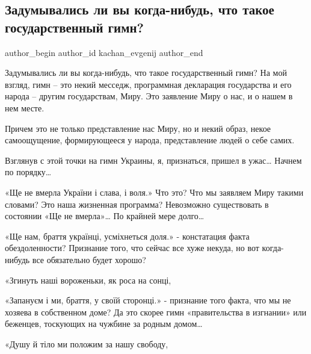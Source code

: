  
 
 
 
 
 
\subsection{Задумывались ли вы когда-нибудь, что такое государственный гимн?}
\label{sec:06_07_2021.fb.kachan_evgenij.1.gos_gimn_ukraina}
 
\ifcmt
 author_begin
   author_id kachan_evgenij
 author_end
\fi

Задумывались ли вы когда-нибудь, что такое государственный гимн? На мой взгляд,
гимн – это некий месседж, программная декларация государства и его народа –
другим государствам, Миру. Это заявление Миру о нас, и о нашем в нем месте.

Причем это не только представление нас Миру, но и некий образ, некое
самоощущение, формирующееся у народа, представление людей о себе самих.

Взглянув с этой точки на гимн Украины, я, признаться, пришел в ужас… Начнем по порядку…

«Ще не вмерла України і слава, і воля.» Что это? Что мы заявляем Миру такими
словами? Это наша жизненная программа? Невозможно существовать в состоянии «Ще
не вмерла»… По крайней мере долго… 

«Ще нам, браття українці, усміхнеться доля.» - констатация факта
обездоленности? Признание того, что сейчас все хуже некуда, но вот когда-нибудь
все обязательно будет хорошо?

«Згинуть наші вороженьки, як роса на сонці,

«Запануєм і ми, браття, у своїй сторонці.» - признание того факта, что мы не
хозяева в собственном доме? Да это скорее гимн «правительства в изгнании» или
беженцев, тоскующих на чужбине за родным домом…

«Душу й тіло ми положим за нашу свободу,

